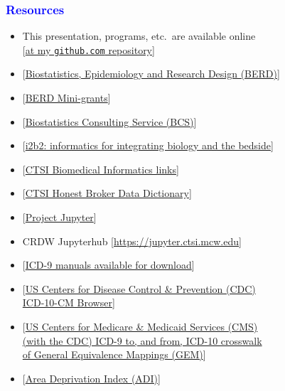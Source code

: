 \documentclass[11pt,pdftex,dvipsnames,usenames]{beamer}
\begin{document}
\begin{frame}[fragile]\frametitle{\bf\textcolor{blue}{Resources}}

\begin{itemize}
\item This presentation, programs, etc.\ are available online\\
\textcolor{PineGreen}{[\href{https://github.com/rsparapa/CTSI/tree/main/Summer22}{at my \texttt{github.com} repository}]}
\item \textcolor{PineGreen}{[\href{https://ctsi.mcw.edu/about/history/support/berd}
{Biostatistics, Epidemiology and Research Design (BERD)}]}
\item \textcolor{PineGreen}{[\href{https://ctsi.mcw.edu/investigator/services/ctsi-mini-grants/biostatistical-consultation}
{BERD Mini-grants}]}
\item \textcolor{PineGreen}{[\href{https://www.mcw.edu/departments/biostatistics/biostatistics-consulting-service}{Biostatistics Consulting Service (BCS)}]}
\item \textcolor{PineGreen}{[\href{https://www.i2b2.org}
{i2b2: informatics for integrating biology and the bedside}]}
\item \textcolor{PineGreen}{[\href{https://ctri.mcw.edu/resources/bmi-links}
{CTSI Biomedical Informatics links}]}
\item \textcolor{PineGreen}{[\href{https://ctsi.mcw.edu/images/sites/37/CTSI-Honest-Broker-Data-Dictionary.pdf}{CTSI Honest Broker Data Dictionary}]}
\item \textcolor{PineGreen}{[\href{https://en.wikipedia.org/wiki/Project_Jupyter}{Project Jupyter}]}
\item CRDW Jupyterhub \textcolor{PineGreen}{[\href{https://jupyter.ctsi.mcw.edu}{https://jupyter.ctsi.mcw.edu}]}
\item \textcolor{PineGreen}{[\href{https://www.cdc.gov/nchs/icd/icd9cm.htm}
{ICD-9 manuals available for download}]}
\item \textcolor{PineGreen}{[\href{https://icd10cmtool.cdc.gov}
{US Centers for Disease Control \& Prevention (CDC)\\ 
ICD-10-CM Browser}]}
\item \textcolor{PineGreen}{[\href{https://www.nber.org/research/data/icd-9-cm-and-icd-10-cm-and-icd-10-pcs-crosswalk-or-general-equivalence-mappings}
{US Centers for Medicare \& Medicaid Services (CMS) \\
(with the CDC) ICD-9 to, and from, ICD-10 crosswalk \\
of General Equivalence Mappings (GEM)}]}
\item \textcolor{PineGreen}{[\href{https://www.neighborhoodatlas.medicine.wisc.edu}{Area Deprivation Index (ADI)}]}
\end{itemize}

\end{frame}
\end{document}
